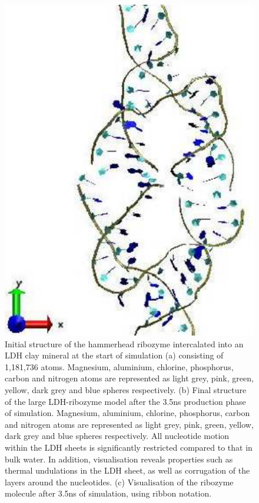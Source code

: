 \begin{figure}
\begin{center}
           \includegraphics[scale=0.3]{subproject1-bioclays/pic3}
        \end{center}
        \caption{\small Initial structure of the hammerhead ribozyme intercalated into an LDH clay mineral at the start of simulation (a) consisting of 1,181,736 atoms.  Magnesium, aluminium, chlorine, phosphorus, carbon and nitrogen atoms are represented as light grey, pink, green, yellow, dark grey and blue spheres respectively. (b) Final structure of the large LDH-ribozyme model after the 3.5ns production phase of simulation.  Magnesium, aluminium, chlorine, phosphorus, carbon and nitrogen atoms are represented as light grey, pink, green, yellow, dark grey and blue spheres respectively.  All nucleotide motion within the LDH sheets is significantly restricted compared to that in bulk water. In addition, visualisation reveals properties such as thermal undulations in the LDH sheet, as well as corrugation of the layers around the nucleotides. (c) Visualisation of the ribozyme molecule after 3.5ns of simulation, using ribbon notation.}
\label{F:pics}
\up
\end{figure}

